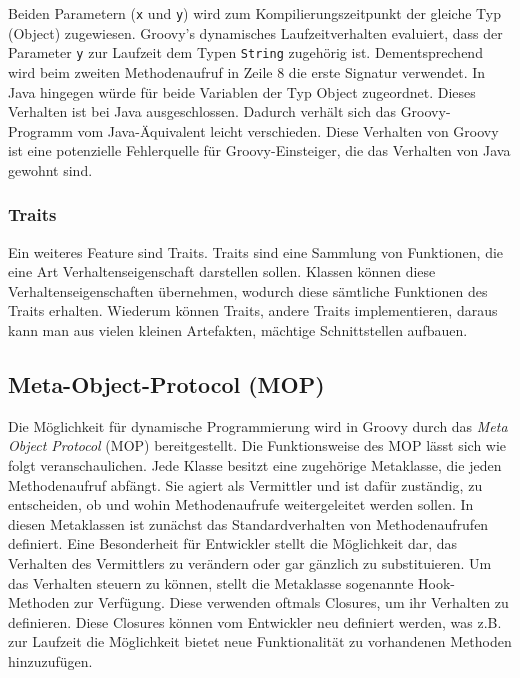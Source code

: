 Beiden Parametern (\texttt{x} und \texttt{y}) wird zum Kompilierungszeitpunkt der gleiche Typ (Object) zugewiesen.
Groovy's dynamisches Laufzeitverhalten evaluiert, dass der Parameter \texttt{y} zur Laufzeit dem Typen \texttt{String} zugehörig ist.
Dementsprechend wird beim zweiten Methodenaufruf in Zeile 8 die erste Signatur verwendet.
In Java hingegen würde für beide Variablen der Typ Object zugeordnet.
Dieses Verhalten ist bei Java ausgeschlossen.
Dadurch verhält sich das Groovy-Programm vom Java-Äquivalent leicht verschieden.
Diese Verhalten von Groovy ist eine potenzielle Fehlerquelle für Groovy-Einsteiger, die das Verhalten von Java gewohnt sind.


\subsubsection{Traits}
Ein weiteres Feature sind Traits. Traits sind eine Sammlung von Funktionen, die eine Art Verhaltenseigenschaft darstellen sollen.
Klassen können diese Verhaltenseigenschaften übernehmen, wodurch diese sämtliche Funktionen des Traits erhalten. 
Wiederum können Traits, andere Traits implementieren, daraus kann man aus vielen kleinen Artefakten, mächtige Schnittstellen aufbauen.



\subsection{Meta-Object-Protocol (MOP)}
Die Möglichkeit für dynamische Programmierung wird in Groovy durch das \textit{Meta Object Protocol} (MOP) bereitgestellt. 
Die Funktionsweise des MOP lässt sich wie folgt veranschaulichen. Jede Klasse besitzt eine zugehörige Metaklasse, die jeden Methodenaufruf abfängt. 
Sie agiert als Vermittler und ist dafür zuständig, zu entscheiden, ob und wohin Methodenaufrufe weitergeleitet werden sollen. 
In diesen Metaklassen ist zunächst das Standardverhalten von Methodenaufrufen definiert. 
Eine Besonderheit für Entwickler stellt die Möglichkeit dar, das Verhalten des Vermittlers zu verändern oder gar gänzlich zu substituieren. 
Um das Verhalten steuern zu können, stellt die Metaklasse sogenannte Hook-Methoden zur Verfügung. 
Diese verwenden oftmals Closures, um ihr Verhalten zu definieren. 
Diese Closures können vom Entwickler neu definiert werden, was z.B. zur Laufzeit die Möglichkeit bietet neue Funktionalität zu vorhandenen Methoden hinzuzufügen.

